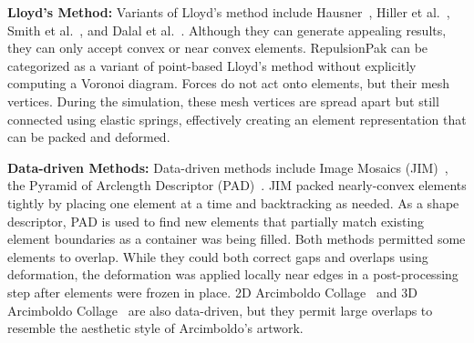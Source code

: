 \newtext
{
\textbf{Lloyd's Method:}
Variants of Lloyd's method include
Hausner~\cite{Hausner2001}, Hiller et al.~\cite{Hiller2003}, 
Smith et al.~\cite{Smith2005}, and Dalal et al.~\cite{Dalal2006}.
Although they can generate appealing results, they can only accept
convex or near convex elements. 
RepulsionPak can be categorized as a variant of point-based Lloyd's method without explicitly computing a Voronoi diagram.
Forces do not act onto elements, but their mesh vertices.
During the simulation, these mesh vertices are spread apart but still connected using elastic springs,
effectively creating an element representation that can be packed and deformed.
}






\newtext
{
\textbf{Data-driven Methods:}
Data-driven methods include Image Mosaics (JIM)~\cite{Kim2002}, 
the Pyramid of Arclength Descriptor (PAD)~\cite{Kwan2016}.
JIM packed nearly-convex elements tightly by placing one element at a time and
backtracking as needed.  As a shape descriptor, 
PAD is used to find new elements that partially match
existing element boundaries as a container was being filled.  Both
methods permitted some elements to overlap.  While they could
both correct gaps and overlaps using deformation, the deformation
was applied locally near edges in a post-processing step after
elements were frozen in place. 
2D {Arcimboldo} Collage~\cite{Huang2011} and 3D {Arcimboldo} Collage~\cite{Gal2007B}
are also data-driven, but they permit large overlaps to 
resemble the aesthetic style of Arcimboldo's artwork. 
}


